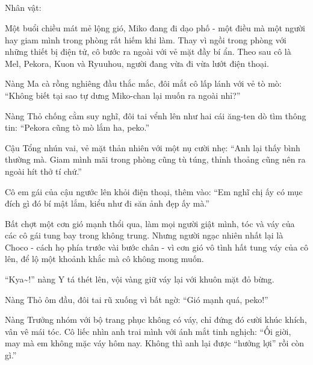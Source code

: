 \documentclass[../main.tex]{subfiles}
\begin{document}
\newpage

\subsection*{\label{ep-S13.IV}}
\begin{center}
  {\caviar\fontsize{12pt}{12pt}\selectfont Nhân vật:      }
\end{center}

Một buổi chiều mát mẻ lộng gió, Miko đang đi dạo phố - một điều mà một người hay giam mình trong phòng rất hiếm khi làm. Thay vì ngồi trong phòng với những thiết bị điện tử, cô bước ra ngoài với vẻ mặt đầy bí ẩn. Theo sau cô là Mel, Pekora, Kuon và Ryuuhou, người đang vừa đi vừa lướt điện thoại.


Nàng Ma cà rồng nghiêng đầu thắc mắc, đôi mắt cô lấp lánh với vẻ tò mò: ``Không biết tại sao tự dưng Miko-chan lại muốn ra ngoài nhỉ?''

Nàng Thỏ chống cằm suy nghĩ, đôi tai vểnh lên như hai cái ăng-ten dò tìm thông tin: ``Pekora cũng tò mò lắm ha, peko.''

Cậu Tổng nhún vai, vẻ mặt thản nhiên với một nụ cười nhẹ: ``Anh lại thấy bình thường mà. Giam mình mãi trong phòng cũng tù túng, thỉnh thoảng cũng nên ra ngoài hít thở tí chứ.''

Cô em gái của cậu ngước lên khỏi điện thoại, thêm vào: ``Em nghĩ chị ấy có mục đích gì đó bí mật lắm, kiểu như đi săn ảnh đẹp ấy mà.''

Bất chợt một cơn gió mạnh thổi qua, làm mọi người giật mình, tóc và váy của các cô gái tung bay trong không trung. Nhưng người ngạc nhiên nhất lại là Choco - cách họ phía trước vài bước chân - vì cơn gió vô tình hất tung váy của cô lên, để lộ một khoảnh khắc mà cô không mong muốn.

``Kya\~{}!'' nàng Y tá thét lên, vội vàng giữ váy lại với khuôn mặt đỏ bừng.

Nàng Thỏ ôm đầu, đôi tai rũ xuống vì bất ngờ: ``Gió mạnh quá, peko!''

Nàng Trưởng nhóm với bộ trang phục không có váy, chỉ đứng đó cười khúc khích, vân vê mái tóc. Cô liếc nhìn anh trai mình với ánh mắt tinh nghịch: ``Ối giời, may mà em không mặc váy hôm nay. Không thì anh lại được ``hưởng lợi'' rồi còn gì.''
\end{document}
